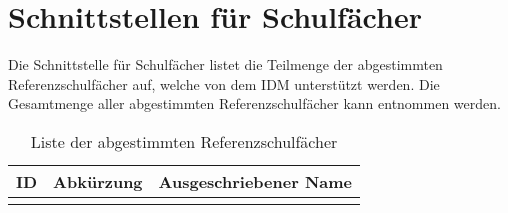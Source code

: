 \section{Schnittstellen für Schulfächer}
Die Schnittstelle für Schulfächer listet die Teilmenge der abgestimmten Referenzschulfächer auf, welche von dem IDM unterstützt werden.
Die Gesamtmenge aller abgestimmten Referenzschulfächer kann  entnommen werden.

\begin{longtable}{|p{}|p{}|p{}|}
\caption{Liste der abgestimmten Referenzschulfächer}
\endfoot
\caption{Liste der abgestimmten Referenzschulfächer}
		\label{tab:rest:api:school-subjects:list}
\endlastfoot 
\hline
\textbf{ID} & \textbf{Abkürzung} & \textbf{Ausgeschriebener Name} \\ \hline
\endhead
 & &  \\ \hline
	\end{longtable}


%

%
%